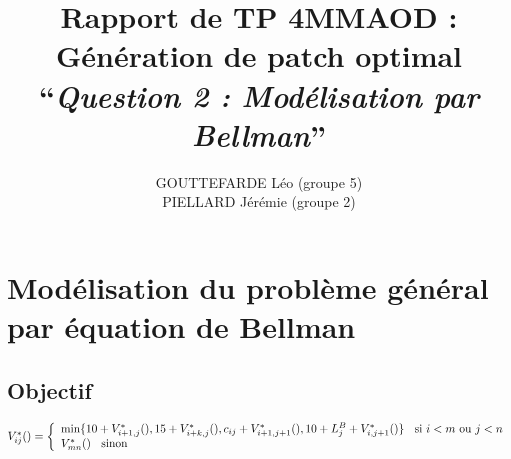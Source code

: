 \documentclass[a4paper, 10pt, french]{article}
\title{Rapport de TP 4MMAOD : Génération de patch optimal\\
``{\em Question 2 : Modélisation par Bellman}'' }
\author{
GOUTTEFARDE Léo (groupe 5)
\\ PIELLARD Jérémie (groupe 2)
}
\begin{document}
\maketitle

\section*{Modélisation du problème général par équation de Bellman}

\subsection*{Objectif}

$V^*_{ij}() = \left\{
\begin{array}{ll}
\min \{ 10 + V^*_{i+1,j}(),
15 + V^*_{i+k,j}(),
c_{ij} + V^*_{i+1,j+1}(),
10 + L_j^B + V^*_{i,j+1}() \} \hspace{2mm} \text{ si $i < m$ ou $j < n$}\\
V^*_{mn}() \hspace{2mm} \text{ sinon}
\end{array}
\right.$

\end{document}
